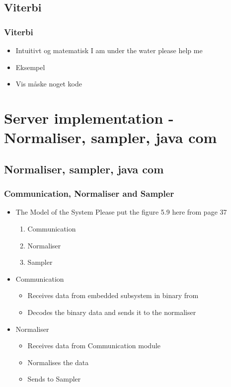
\subsection{Viterbi}
\begin{frame}
	\frametitle{Viterbi}
	\begin{itemize}
		\item Intuitivt og matematisk I am under the water please help me
		\item Eksempel
		\item Vis måske noget kode
	\end{itemize}
\end{frame}
\section{Server implementation - Normaliser, sampler, java com}
\subsection{Normaliser, sampler, java com}
\begin{frame}
	\frametitle{Communication, Normaliser and Sampler}
	\begin{itemize}
		\item The Model of the System
                    Please put the figure 5.9 here from page 37 
                    
	         \begin{enumerate}
                         \item Communication
                         \item Normaliser
                         \item Sampler
                 \end{enumerate}
		\item Communication
\begin{itemize}
\item Receives data from embedded subsystem in binary from
\item Decodes the binary data and sends it to the normaliser
\end{itemize}
\item Normaliser
  \begin{itemize}
\item Receives data from Communication module
\item Normalises the data
\item Sends to Sampler
\end{itemize}

	\end{itemize}
 
\end{frame}

